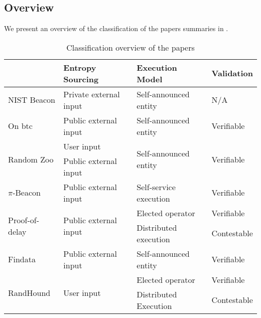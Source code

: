 \subsection{Overview}
\label{sub:overview}
We present an overview of the classification of the papers summaries in .

\begin{table}[htbp]
    \centering
    \begin{tabularx}{\textwidth}{Xlll}
                               & \textbf{Entropy Sourcing}              & \textbf{Execution Model}               & \textbf{Validation}         \\\midrule
NIST Beacon                    & Private external input                 & Self-announced entity                  & N/A                         \\[1.5em]
On btc                         & Public external input                  & Self-announced entity                  & Verifiable                  \\[1.5em]
\multirow{2}{*}{Random Zoo}    & User input                             & \multirow{2}{*}{Self-announced entity} & \multirow{2}{*}{Verifiable} \\
                               & Public external input                  &                                        &                             \\[1.5em]
$\pi$-Beacon                   & Public external input                  & Self-service execution                 & Verifiable                  \\[1.5em]
\multirow{2}{*}{Proof-of-delay}& \multirow{2}{*}{Public external input} & Elected operator                       & Verifiable                  \\
                               &                                        & Distributed execution                  & Contestable                 \\[1.5em]
Findata                        & Public external input                  & Self-announced entity                  & Verifiable                  \\[1.5em]
\multirow{2}{*}{RandHound}     & \multirow{2}{*}{User input}            & Elected operator                       & Verifiable                  \\
                               &                                        & Distributed Execution                  & Contestable
    \end{tabularx}
    \caption{Classification overview of the papers}\label{tab:paper_overview}
\end{table}

